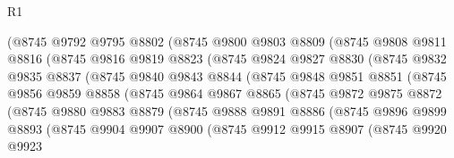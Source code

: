 \begin{lexlean}{R1}
\begin{coremodule}
                (@8745
                  @9792
                  @9795
                  @8802
                  (@8745
                    @9800
                    @9803
                    @8809
                    (@8745
                      @9808
                      @9811
                      @8816
                      (@8745
                        @9816
                        @9819
                        @8823
                        (@8745
                          @9824
                          @9827
                          @8830
                          (@8745
                            @9832
                            @9835
                            @8837
                            (@8745
                              @9840
                              @9843
                              @8844
                              (@8745
                                @9848
                                @9851
                                @8851
                                (@8745
                                  @9856
                                  @9859
                                  @8858
                                  (@8745
                                    @9864
                                    @9867
                                    @8865
                                    (@8745
                                      @9872
                                      @9875
                                      @8872
                                      (@8745
                                        @9880
                                        @9883
                                        @8879
                                        (@8745
                                          @9888
                                          @9891
                                          @8886
                                          (@8745
                                            @9896
                                            @9899
                                            @8893
                                            (@8745
                                              @9904
                                              @9907
                                              @8900
                                              (@8745
                                                @9912
                                                @9915
                                                @8907
                                                (@8745
                                                  @9920
                                                  @9923

\end{coremodule}
\end{lexlean}
